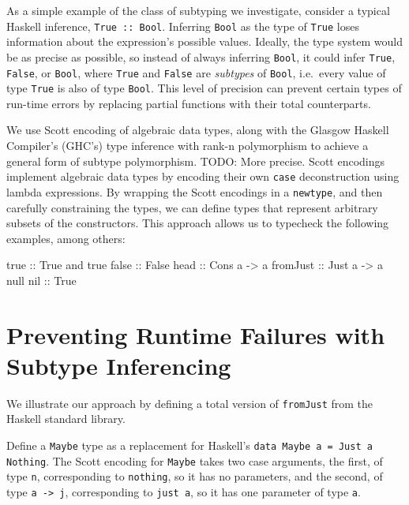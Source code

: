 \documentclass[]{article}
\newenvironment{Shaded}{}{}
\newcommand{\DataTypeTok}[1]{\textcolor[rgb]{0.56,0.13,0.00}{{#1}}}
\newcommand{\OtherTok}[1]{\textcolor[rgb]{0.00,0.44,0.13}{{#1}}}
\newcommand{\NormalTok}[1]{{#1}}
\begin{document}
As a simple example of the class of subtyping we investigate, consider a
typical Haskell inference, \texttt{True :: Bool}. Inferring
\texttt{Bool} as the type of \texttt{True} loses information about the
expression's possible values. Ideally, the type system would be as
precise as possible, so instead of always inferring \texttt{Bool}, it
could infer \texttt{True}, \texttt{False}, or \texttt{Bool}, where
\texttt{True} and \texttt{False} are \emph{subtypes} of \texttt{Bool},
i.e.~every value of type \texttt{True} is also of type \texttt{Bool}.
This level of precision can prevent certain types of run-time errors by
replacing partial functions with their total counterparts.

We use Scott encoding of algebraic data types, along with the Glasgow
Haskell Compiler's (GHC's) type inference with rank-n polymorphism to
achieve a general form of subtype polymorphism. TODO: More precise.
Scott encodings implement algebraic data types by encoding their own
\texttt{case} deconstruction using lambda expressions. By wrapping the
Scott encodings in a \texttt{newtype}, and then carefully constraining
the types, we can define types that represent arbitrary subsets of the
constructors. This approach allows us to typecheck the following
examples, among others:

\begin{Shaded}
\begin{Highlighting}[]
\OtherTok{   true ::} \DataTypeTok{True}
   \NormalTok{and true}\OtherTok{ false ::} \DataTypeTok{False}
\OtherTok{   head ::} \DataTypeTok{Cons} \NormalTok{a }\OtherTok{->} \NormalTok{a}
\OtherTok{   fromJust ::} \DataTypeTok{Just} \NormalTok{a }\OtherTok{->} \NormalTok{a}
   \NormalTok{null}\OtherTok{ nil ::} \DataTypeTok{True}
\end{Highlighting}
\end{Shaded}

\section{Preventing Runtime Failures with Subtype
Inferencing}\label{preventing-runtime-failures-with-subtype-inferencing}

We illustrate our approach by defining a total version of
\texttt{fromJust} from the Haskell standard library.

Define a \texttt{Maybe} type as a replacement for Haskell's
\texttt{data Maybe a = Just a \textbar{} Nothing}. The Scott encoding
for \texttt{Maybe} takes two case arguments, the first, of type
\texttt{n}, corresponding to \texttt{nothing}, so it has no parameters,
and the second, of type \texttt{a -\textgreater{} j}, corresponding to
\texttt{just a}, so it has one parameter of type \texttt{a}.
\end{document}
